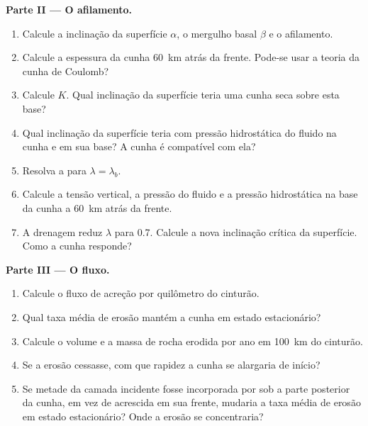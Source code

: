 \begin{problem}
\medskip\noindent\textbf{Parte II --- O afilamento.}
\begin{enumerate}[resume]
  \item Calcule a inclinação da superfície $\alpha$, o mergulho basal $\beta$ e o
        afilamento.
  \item Calcule a espessura da cunha \qty{60}{km} atrás da frente. Pode-se usar a
        teoria da cunha de Coulomb?
  \item Calcule $K$. Qual inclinação da superfície teria uma cunha seca sobre esta base?
  \item Qual inclinação da superfície teria com pressão hidrostática do fluido na
        cunha e em sua base? A cunha é compatível com ela?
  \item Resolva a  para $\lambda = \lambda_b$.
  \item Calcule a tensão vertical, a pressão do fluido e a pressão hidrostática na
        base da cunha a \qty{60}{km} atrás da frente.
  \item A drenagem reduz $\lambda$ para 0.7. Calcule a nova inclinação crítica da
        superfície. Como a cunha responde?
\end{enumerate}

\medskip\noindent\textbf{Parte III --- O fluxo.}
\begin{enumerate}[resume]
  \item Calcule o fluxo de acreção por quilômetro do cinturão.
  \item Qual taxa média de erosão mantém a cunha em estado estacionário?
  \item Calcule o volume e a massa de rocha erodida por ano em
        \qty{100}{km} do cinturão.
  \item Se a erosão cessasse, com que rapidez a cunha se alargaria de início?
  \item Se metade da camada incidente fosse incorporada por  sob a
        parte posterior da cunha, em vez de acrescida em sua frente, mudaria a taxa
        média de erosão em estado estacionário? Onde a erosão se concentraria?
\end{enumerate}


\end{problem}
